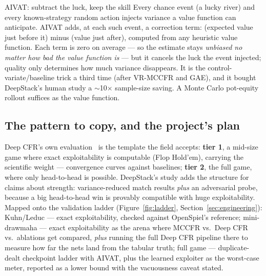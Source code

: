 \begin{intuition}{AIVAT: subtract the luck, keep the skill}
Every chance event (a lucky river) and every known-strategy random action injects variance a value function can anticipate. AIVAT adds, at each such event, a correction term: (expected value just before it) minus (value just after), computed from any heuristic value function. Each term is zero on average --- so the estimate stays \emph{unbiased no matter how bad the value function is} --- but it cancels the luck the event injected; quality only determines how much variance disappears. It is the control-variate/baseline trick a third time (after VR-MCCFR and GAE), and it bought DeepStack's human study a $\sim$10$\times$ sample-size saving. A Monte Carlo pot-equity rollout suffices as the value function.
\end{intuition}

\subsection*{The pattern to copy, and the project's plan}

Deep CFR's own evaluation~\cite{brown2019deep} is the template the field accepts: \textbf{tier 1}, a mid-size game where exact exploitability is computable (Flop Hold'em), carrying the scientific weight --- convergence curves against baselines; \textbf{tier 2}, the full game, where only head-to-head is possible. DeepStack's study adds the structure for claims about strength: variance-reduced match results \emph{plus} an adversarial probe, because a big head-to-head win is provably compatible with huge exploitability. Mapped onto the validation ladder (Figure~\ref{fig:ladder}, Section~\ref{sec:engineering}): Kuhn/Leduc --- exact exploitability, checked against OpenSpiel's reference; mini-drawmaha --- exact exploitability as the arena where MCCFR vs.\ Deep CFR vs.\ ablations get compared, \emph{plus} running the full Deep CFR pipeline there to measure how far the nets land from the tabular truth; full game --- duplicate-dealt checkpoint ladder with AIVAT, plus the learned exploiter as the worst-case meter, reported as a lower bound with the vacuousness caveat stated.
